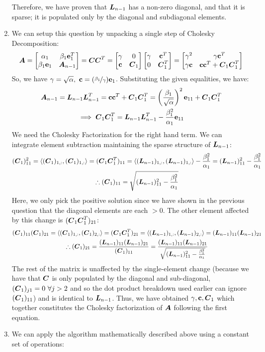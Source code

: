 \documentclass[]{exam}
\begin{document}
\begin{questions}
\begin{enumerate}[label=\arabic*.]
		Therefore, we have proven that $\boldsymbol{L}_{n-1}$ has a non-zero diagonal, and that it is sparse; it is populated only by the diagonal and subdiagonal elements.
	\item We can setup this question by unpacking a single step of Cholesky Decomposition:
		\begin{gather*}
			\boldsymbol{A} = \begin{bmatrix} \alpha_1 & \beta_1 \boldsymbol{\mathrm{e}}_1^T \\ \beta_1 \boldsymbol{\mathrm{e}}_1 & \boldsymbol{A}_{n - 1} \end{bmatrix} = \boldsymbol{C} \boldsymbol{C}^T = \begin{bmatrix} \gamma & 0 \\ \boldsymbol{\mathrm{c}} & \boldsymbol{C}_{1} \end{bmatrix} \begin{bmatrix} \gamma & \boldsymbol{\mathrm{c}}^T \\ 0 & \boldsymbol{C}_{1}^T \end{bmatrix} = \begin{bmatrix} \gamma^2 & \gamma \boldsymbol{\mathrm{c}}^T \\ \gamma \boldsymbol{\mathrm{c}} & \boldsymbol{\mathrm{c}} \boldsymbol{\mathrm{c}}^T + \boldsymbol{C}_1 \boldsymbol{C}_1^T \end{bmatrix}
		\end{gather*}
		So, we have $\gamma = \sqrt{\alpha},~\boldsymbol{\mathrm{c}} = (\nicefrac{\beta_1}{\gamma}) \boldsymbol{\mathrm{e}}_1$. Substituting the given equalities, we have:
		\begin{gather*}
			\boldsymbol{A}_{n-1} = \boldsymbol{L}_{n-1} \boldsymbol{L}_{n-1}^T = \boldsymbol{\mathrm{c}} \boldsymbol{\mathrm{c}}^T + \boldsymbol{C}_1 \boldsymbol{C}_1^T = \left(\frac{\beta_1}{\sqrt{\alpha}}\right)^2 \boldsymbol{\mathrm{e}}_{11} + \boldsymbol{C}_1 \boldsymbol{C}_1^T \\
			\implies \boldsymbol{C}_1 \boldsymbol{C}_1^T = \boldsymbol{L}_{n-1} \boldsymbol{L}_{n-1}^T - \frac{\beta_1^2}{\alpha_1} \boldsymbol{\mathrm{e}}_{11}
		\end{gather*}
		We need the Cholesky Factorization for the right hand term. We can integrate element subtraction maintaining the sparse structure of $\boldsymbol{L}_{n-1}$:
		\begin{gather*}
			(\boldsymbol{C}_1)_{11}^2 = \langle (\boldsymbol{C}_1)_{1, :}, (\boldsymbol{C}_1)_{1, :} \rangle = (\boldsymbol{C}_1 \boldsymbol{C}_1^T)_{11} = \langle (\boldsymbol{L}_{n-1})_{1,:}, (\boldsymbol{L}_{n-1})_{1,:} \rangle - \frac{\beta_1^2}{\alpha_1} = (\boldsymbol{L}_{n-1})_{11}^2 - \frac{\beta_1^2}{\alpha_1} \\
			\therefore (\boldsymbol{C}_1)_{11} = \sqrt{(\boldsymbol{L}_{n-1})_{11}^2 - \frac{\beta_1^2}{\alpha_1}}
		\end{gather*}
		Here, we only pick the positive solution since we have shown in the previous question that the diagonal elements are each $> 0$. The other element affected by this change is $(\boldsymbol{C}_1 \boldsymbol{C}_1^T)_{21}$:
		\begin{gather*}
			(\boldsymbol{C}_1)_{11} (\boldsymbol{C}_1)_{21} = \langle (\boldsymbol{C}_1)_{1, :}, (\boldsymbol{C}_1)_{2, :} \rangle = (\boldsymbol{C}_1 \boldsymbol{C}_1^T)_{21} = \langle (\boldsymbol{L}_{n-1})_{1, :}, (\boldsymbol{L}_{n-1})_{2, :} \rangle = (\boldsymbol{L}_{n-1})_{11} (\boldsymbol{L}_{n-1})_{21} \\
			\therefore (\boldsymbol{C}_1)_{21} = \frac{(\boldsymbol{L}_{n-1})_{11} (\boldsymbol{L}_{n-1})_{21}}{(\boldsymbol{C}_1)_{11}} = \frac{(\boldsymbol{L}_{n-1})_{11} (\boldsymbol{L}_{n-1})_{21}}{\sqrt{(\boldsymbol{L}_{n-1})_{11}^2 - \frac{\beta_1^2}{\alpha_1}}}
		\end{gather*}
		The rest of the matrix is unaffected by the single-element change (because we have that $\boldsymbol{C}$ is only populated by the diagonal and sub-diagonal, $(\boldsymbol{C}_1)_{j1} = 0~\forall j > 2$ and so the dot product breakdown used earlier can ignore $(\boldsymbol{C}_1)_{11}$) and is identical to $\boldsymbol{L}_{n-1}$. Thus, we have obtained $\gamma, \boldsymbol{\mathrm{c}}, \boldsymbol{C}_1$ which together constitutes the Cholesky factorization of $\boldsymbol{A}$ following the first equation.
	\item We can apply the algorithm mathematically described above using a constant set of operations:

\end{enumerate}
\end{questions}
\end{document}
